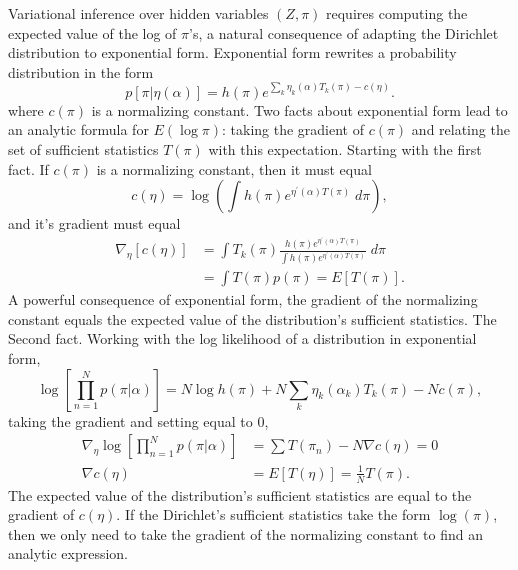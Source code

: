 \documentclass[sagev,times,Review,10pt]{sagej}
\def\l{\left}
\def\r{\right}
\newcommand{\f}{\frac}
\begin{document}
\begin{appendix}
Variational inference over hidden variables $(Z,\pi)$ requires computing the expected value of the log of $\pi$'s, a natural consequence of adapting the Dirichlet distribution to exponential form.
Exponential form rewrites a probability distribution in the form
\begin{equation}
  p\l[\pi|\eta(\alpha)\r] = h(\pi)e^{ \sum_{k} \eta_{k}(\alpha) T_{k}(\pi) - c(\eta)}.
\end{equation}
where $c(\pi)$ is a normalizing constant.
Two facts about exponential form lead to an analytic formula for $E(\log \pi)$: taking the gradient of $c(\pi)$ and relating the set of sufficient statistics $T(\pi)$ with this expectation.
Starting with the first fact.
If $c(\pi)$ is a normalizing constant, then it must equal
\begin{equation}
  c(\eta) = \log \l( \int  h(\pi)e^{ \eta^{'}(\alpha)T(\pi)} \; d \pi  \r),
\end{equation}
and it's gradient must equal
\begin{align}
   \nabla_{\eta} \l[c(\eta)\r] &= \int T_{k}(\pi) \f{h(\pi)e^{ \eta^{'}(\alpha)T(\pi)}}{\int  h(\pi)e^{ \eta^{'}(\alpha)T(\pi) }} \; d \pi\\
                &= \int T(\pi) p(\pi) = E[T(\pi)] .
\end{align}
A powerful consequence of exponential form, the gradient of the normalizing constant equals the expected value of the distribution's sufficient statistics.
The Second fact.
Working with the log likelihood of a distribution in exponential form, 
\begin{equation}
  \log \l[ \prod_{n=1}^{N} p(\pi|\alpha)\r] = N \log h(\pi) +  N \sum_{k} \eta_{k}(\alpha_{k})T_{k}(\pi) - N c(\pi),
\end{equation}
taking the gradient and setting equal to 0,
\begin{align}
  \nabla_{\eta} \log \l[ \prod_{n=1}^{N} p(\pi|\alpha)\r] &=  \sum T(\pi_{n}) - N \nabla c(\eta) = 0\\
  \nabla c(\eta) &= E\l[ T(\eta) \r] = \f{1}{N} T(\pi).
\end{align}
The expected value of the distribution's sufficient statistics are equal to the gradient of $c(\eta)$.
If the Dirichlet's sufficient statistics take the form $\log(\pi)$, then we only need to take the gradient of the normalizing constant to find an analytic expression.


\end{appendix}
\end{document}
